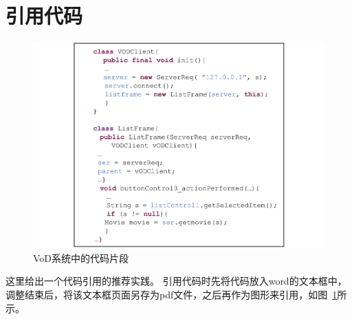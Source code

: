 \section{引用代码}

\begin{figure}[htb]
  \centering
  \includegraphics[width=\linewidth]{FIGs/chapter4/VoDCodeSample.pdf}
  \caption{VoD系统中的代码片段}\label{fig_VoDCodeSample}
\end{figure}

这里给出一个代码引用的推荐实践。
引用代码时先将代码放入word的文本框中，调整结束后，将该文本框页面另存为pdf文件，之后再作为图形来引用，如图~\ref{fig_VoDCodeSample}所示。


